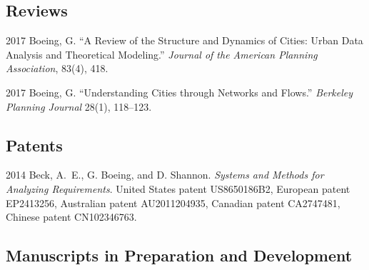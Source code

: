 \documentclass{academiccv}
\begin{document}
\subsection*{Reviews}

\begin{tablist}
	
\item[2017] \tab Boeing, G. \enquote{A Review of the Structure and Dynamics of Cities: Urban Data Analysis and Theoretical Modeling.} \emph{Journal of the American Planning Association}, 83(4), 418.
	
\item[2017] \tab Boeing, G. \enquote{Understanding Cities through Networks and Flows.} \emph{Berkeley Planning Journal} 28(1), 118--123.
	
\end{tablist}



\subsection*{Patents}

\begin{tablist}

\item[2014] \tab Beck, A.~E., G. Boeing, and D. Shannon. \emph{Systems and Methods for Analyzing Requirements}. United States patent US8650186B2, European patent EP2413256, Australian patent AU2011204935, Canadian patent CA2747481, Chinese patent CN102346763.

\end{tablist}



\subsection*{Manuscripts in Preparation and Development}
\end{document}
